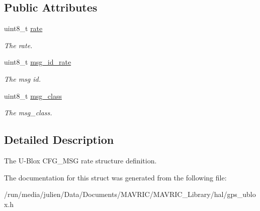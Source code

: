 \subsection*{Public Attributes}
\begin{DoxyCompactItemize}
\item 
\hypertarget{structubx__cfg__msg__rate__t_a67ce70a804cdc9898a00e0fbcd3ca63a}{uint8\+\_\+t \hyperlink{structubx__cfg__msg__rate__t_a67ce70a804cdc9898a00e0fbcd3ca63a}{rate}}\label{structubx__cfg__msg__rate__t_a67ce70a804cdc9898a00e0fbcd3ca63a}

\begin{DoxyCompactList}\small\item\em The rate. \end{DoxyCompactList}\item 
\hypertarget{structubx__cfg__msg__rate__t_a132dce96e13d06310f894d5f6c707c6a}{uint8\+\_\+t \hyperlink{structubx__cfg__msg__rate__t_a132dce96e13d06310f894d5f6c707c6a}{msg\+\_\+id\+\_\+rate}}\label{structubx__cfg__msg__rate__t_a132dce96e13d06310f894d5f6c707c6a}

\begin{DoxyCompactList}\small\item\em The msg id. \end{DoxyCompactList}\item 
\hypertarget{structubx__cfg__msg__rate__t_ab7241065540d29c86ed069d35ab47f01}{uint8\+\_\+t \hyperlink{structubx__cfg__msg__rate__t_ab7241065540d29c86ed069d35ab47f01}{msg\+\_\+class}}\label{structubx__cfg__msg__rate__t_ab7241065540d29c86ed069d35ab47f01}

\begin{DoxyCompactList}\small\item\em The msg\+\_\+class. \end{DoxyCompactList}\end{DoxyCompactItemize}


\subsection{Detailed Description}
The U-\/\+Blox C\+F\+G\+\_\+\+M\+S\+G rate structure definition. 

The documentation for this struct was generated from the following file\+:\begin{DoxyCompactItemize}
\item 
/run/media/julien/\+Data/\+Documents/\+M\+A\+V\+R\+I\+C/\+M\+A\+V\+R\+I\+C\+\_\+\+Library/hal/gps\+\_\+ublox.\+h\end{DoxyCompactItemize}
